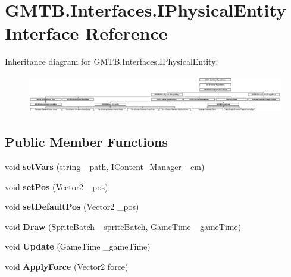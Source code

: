 \hypertarget{interface_g_m_t_b_1_1_interfaces_1_1_i_physical_entity}{}\section{G\+M\+T\+B.\+Interfaces.\+I\+Physical\+Entity Interface Reference}
\label{interface_g_m_t_b_1_1_interfaces_1_1_i_physical_entity}
Inheritance diagram for G\+M\+T\+B.\+Interfaces.\+I\+Physical\+Entity\+:\begin{figure}[H]
\begin{center}
\leavevmode
\includegraphics[height=1.649832cm]{interface_g_m_t_b_1_1_interfaces_1_1_i_physical_entity}
\end{center}
\end{figure}
\subsection*{Public Member Functions}
\begin{DoxyCompactItemize}
\item 
\mbox{\label{interface_g_m_t_b_1_1_interfaces_1_1_i_physical_entity_a5f11a81e3a0dca75de102b3e9f296971}} 
void {\bfseries set\+Vars} (string \+\_\+path, \mbox{\hyperlink{interface_g_m_t_b_1_1_interfaces_1_1_i_content___manager}{I\+Content\+\_\+\+Manager}} \+\_\+cm)
\item 
\mbox{\label{interface_g_m_t_b_1_1_interfaces_1_1_i_physical_entity_a47137a940cf097f86123d6357c3d5b14}} 
void {\bfseries set\+Pos} (Vector2 \+\_\+pos)
\item 
\mbox{\label{interface_g_m_t_b_1_1_interfaces_1_1_i_physical_entity_ac66b8aadafdfdd5f1e450f43cf7c16b1}} 
void {\bfseries set\+Default\+Pos} (Vector2 \+\_\+pos)
\item 
\mbox{\label{interface_g_m_t_b_1_1_interfaces_1_1_i_physical_entity_af0a0adf3861df4f0e84d66a2d117739e}} 
void {\bfseries Draw} (Sprite\+Batch \+\_\+sprite\+Batch, Game\+Time \+\_\+game\+Time)
\item 
\mbox{\label{interface_g_m_t_b_1_1_interfaces_1_1_i_physical_entity_a8df13c86808888ea7731bcdc05015ced}} 
void {\bfseries Update} (Game\+Time \+\_\+game\+Time)
\item 
\mbox{\label{interface_g_m_t_b_1_1_interfaces_1_1_i_physical_entity_a0264b2df5969bd89c5e2f904867e7ee8}} 
void {\bfseries Apply\+Force} (Vector2 force)
\end{DoxyCompactItemize}
